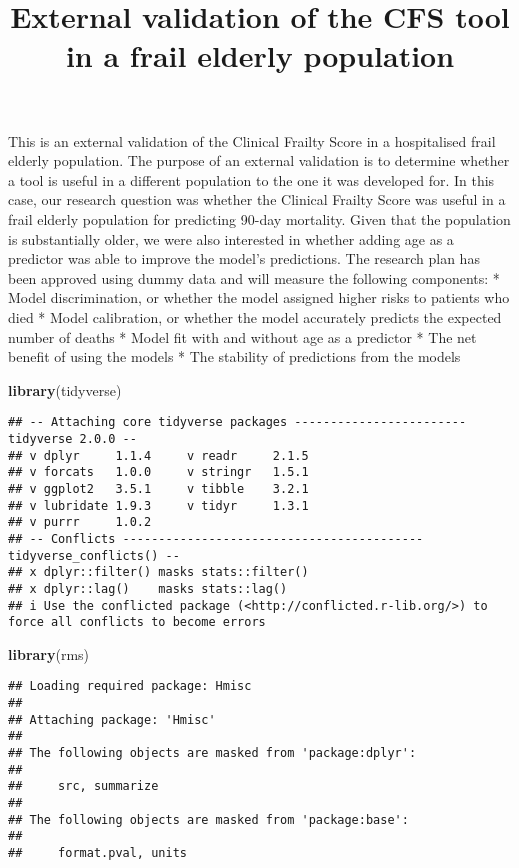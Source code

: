 \documentclass[
]{article}
\title{External validation of the CFS tool in a frail elderly
population}
\author{}
\date{\vspace{-2.5em}}
\newenvironment{Shaded}{\begin{snugshade}}{\end{snugshade}}
\newcommand{\FunctionTok}[1]{\textcolor[rgb]{0.13,0.29,0.53}{\textbf{#1}}}
\newcommand{\NormalTok}[1]{#1}
\begin{document}
\maketitle

This is an external validation of the Clinical Frailty Score in a
hospitalised frail elderly population. The purpose of an external
validation is to determine whether a tool is useful in a different
population to the one it was developed for. In this case, our research
question was whether the Clinical Frailty Score was useful in a frail
elderly population for predicting 90-day mortality. Given that the
population is substantially older, we were also interested in whether
adding age as a predictor was able to improve the model's predictions.
The research plan has been approved using dummy data and will measure
the following components: * Model discrimination, or whether the model
assigned higher risks to patients who died * Model calibration, or
whether the model accurately predicts the expected number of deaths *
Model fit with and without age as a predictor * The net benefit of using
the models * The stability of predictions from the models

\begin{Shaded}
\begin{Highlighting}[]
\FunctionTok{library}\NormalTok{(tidyverse)}
\end{Highlighting}
\end{Shaded}

\begin{verbatim}
## -- Attaching core tidyverse packages ------------------------ tidyverse 2.0.0 --
## v dplyr     1.1.4     v readr     2.1.5
## v forcats   1.0.0     v stringr   1.5.1
## v ggplot2   3.5.1     v tibble    3.2.1
## v lubridate 1.9.3     v tidyr     1.3.1
## v purrr     1.0.2     
## -- Conflicts ------------------------------------------ tidyverse_conflicts() --
## x dplyr::filter() masks stats::filter()
## x dplyr::lag()    masks stats::lag()
## i Use the conflicted package (<http://conflicted.r-lib.org/>) to force all conflicts to become errors
\end{verbatim}

\begin{Shaded}
\begin{Highlighting}[]
\FunctionTok{library}\NormalTok{(rms)}
\end{Highlighting}
\end{Shaded}

\begin{verbatim}
## Loading required package: Hmisc
## 
## Attaching package: 'Hmisc'
## 
## The following objects are masked from 'package:dplyr':
## 
##     src, summarize
## 
## The following objects are masked from 'package:base':
## 
##     format.pval, units
\end{verbatim}
\end{document}
